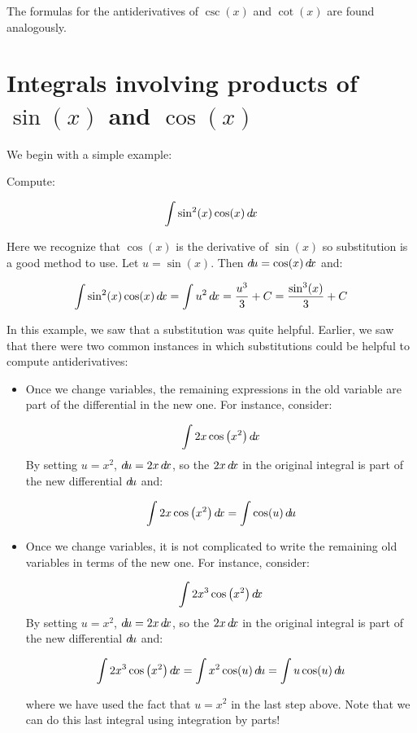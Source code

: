 \documentclass{ximera}
\begin{document}
The formulas for the antiderivatives of $\csc(x)$ and $\cot(x)$ are found analogously.

\section{Integrals involving products of $\sin(x)$ and $\cos(x)$}

We begin with a simple example:

\begin{example}
Compute:

\[
\int \sin^{2}(x) \cos(x) \mathop{}\!d\! x
\]

\begin{explanation}
Here we recognize that $\cos(x)$ is the derivative of $\sin(x)$ so substitution is a good method to use. Let $u=\sin(x)$. Then $\mathop{}\!d\! u=\cos(x) \mathop{}\!d\! x$ and: 

\[ 
\int \sin^{2}(x) \cos(x) \mathop{}\!d\! x = \int u^{2} \mathop{}\!d\! x=\frac{u^{3}}{3}+C=\frac{ \sin^{3}(x)}{3}+C
\]
\end{explanation}

\end{example}

In this example, we saw that a substitution was quite helpful.  Earlier, we saw that there were two common instances in which substitutions could be helpful to compute antiderivatives:

\begin{itemize}
\item Once we change variables, the remaining expressions in the old variable are part of the differential in the new one.  For instance, consider:

\[ \int 2x \cos\left(x^2\right) \mathop{}\!d\! x\]
By setting $u=x^2$, $\mathop{}\!d\! u = 2x \mathop{}\!d\! x$, so the $2x \mathop{}\!d\! x$ in the original integral is part of the new differential $\mathop{}\!d\! u$ and:

\[ \int 2x \cos\left(x^2\right) \mathop{}\!d\! x = \int \cos(u) \mathop{}\!d\! u \]

\item Once we change variables, it is not complicated to write the remaining old variables in terms of the new one.
For instance, consider:

\[ \int 2x^3 \cos\left(x^2\right) \mathop{}\!d\! x\]
By setting $u=x^2$, $\mathop{}\!d\! u = 2x \mathop{}\!d\! x$, so the $2x \mathop{}\!d\! x$ in the original integral is part of the new differential $\mathop{}\!d\! u$ and:

\[ \int 2x^3 \cos\left(x^2\right) \mathop{}\!d\! x = \int x^2 \cos(u) \mathop{}\!d\! u  = \int u \cos(u) \mathop{}\!d\! u \]

where we have used the fact that $u=x^2$ in the last step above.  Note that we can do this last integral using integration by parts!
\end{itemize}
\end{document}
